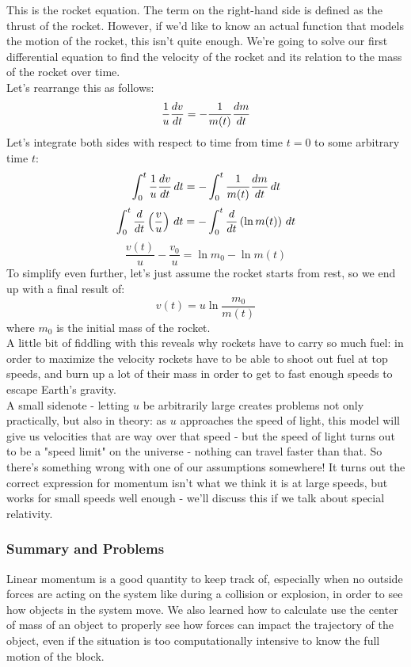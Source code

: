 This is the rocket equation. The term on the right-hand side is defined as the thrust of the rocket. However, if we'd like to know an actual function that models the motion of the rocket, this isn't quite enough. We're going to solve our first differential equation to find the velocity of the rocket and its relation to the mass of the rocket over time. \\
Let's rearrange this as follows: 
\[
	\frac{1}{u} \frac{d v}{d t} = - \frac{1}{m(t)} \frac{d m}{d t} 
\]
Let's integrate both sides with respect to time from time $t=0$ to some arbitrary time $t$:
\[
	\int_0^t \frac{1}{u} \frac{d v}{d t} \, dt = - \int_0^t \frac{1}{m(t)} \frac{d m}{d t} \, dt 
\]
\[
	\int_0^t \frac{d }{d t}\left(\frac{v}{u}\right) \, dt = - \int_0^t \frac{d }{d t} \left(\ln m(t) \right) \, dt
\]
\[
	\frac{v(t)}{u} - \frac{v_0}{u} = \ln m_0 - \ln m(t) 
\]
To simplify even further, let's just assume the rocket starts from rest, so we end up with a final result of:
\[
	v(t) = u \ln \frac{m_0}{m(t)}
\]
where $m_0$ is the initial mass of the rocket. \\
A little bit of fiddling with this reveals why rockets have to carry so much fuel: in order to maximize the velocity rockets have to be able to shoot out fuel at top speeds, and burn up a lot of their mass in order to get to fast enough speeds to escape Earth's gravity. \\
A small sidenote - letting $u$ be arbitrarily large creates problems not only practically, but also in theory: as $u$ approaches the speed of light, this model will give us velocities that are way over that speed - but the speed of light turns out to be a "speed limit" on the universe - nothing can travel faster than that. So there's something wrong with one of our assumptions somewhere! It turns out the correct expression for momentum isn't what we think it is at large speeds, but works for small speeds well enough - we'll discuss this if we talk about special relativity. 
\subsubsection{Summary and Problems}
Linear momentum is a good quantity to keep track of, especially when no outside forces are acting on the system like during a collision or explosion, in order to see how objects in the system move. We also learned how to calculate use the center of mass of an object to properly see how forces can impact the trajectory of the object, even if the situation is too computationally intensive to know the full motion of the block. \\

